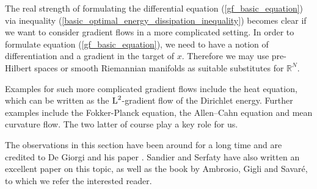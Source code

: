 The real strength of formulating the differential equation 
(\ref{gf_basic_equation}) via inequality 
(\ref{basic_optimal_energy_dissipation_inequality}) becomes clear if we want to 
consider gradient flows in a more complicated setting. In order to formulate 
equation (\ref{gf_basic_equation}), we need to have a notion of differentiation 
and a gradient in the target of $ x $. Therefore we may use pre-Hilbert spaces 
or smooth Riemannian manifolds as suitable substitutes for $ \mathbb{ R }^{ N 
} $. 

Examples for such more complicated gradient flows include the heat equation, 
which can be written as the $ \operatorname{L}^{ 2 } $-gradient flow of the Dirichlet 
energy. 
Further examples include  
the Fokker-Planck equation, the Allen--Cahn equation and mean curvature flow. 
The two latter of course play a key role for us.
\begin{comment}
A first example for a generalization is therefore the heat equation $ \partial_{ t } u - \Delta u = 0 $ for some open and bounded set $ \Omega $. As our space, we shall take $ \mathrm{ H }_{ 0 }^{ 1 } ( \Omega ) $ equipped with the inner product
\begin{equation*}
	\inner*{ u }{ v }
	\coloneqq
	\int
		\inner*{ u }{ v }
	\dd{ x }.
\end{equation*}
Our energy is given by the Dirichlet functional
\begin{equation*}
	\energy ( u ) \coloneqq
	\frac{ 1 }{ 2 }
	\int
		\abs{ \nabla u }^{ 2 }
	\dd{ x }
\end{equation*}
Then we can compute that at least on $ \mathrm{ H }_{ 0 }^{ 1 } \cap \mathrm{ H }^{ 2 } ( \Omega ) $, the Fréchet derivative of $ \energy $ is given by $ \diff ( E ) ( u ) [ v ] = - \int \Delta u v \dd{ x } $.
\end{comment}

The observations in this section have been around for a long time and are 
credited 
to De Giorgi and his paper 
\cite{de_giorgi_new_problems_on_minimizing_movements}. Sandier and Serfaty have 
also written an excellent paper 
\cite{sandler_serfaty_gamme_convergence_of_gf_with_applications_to_gl} on this 
topic, as well as the book 
\cite{ambrosio_gigli_savare_gradient_flows_in_metric_spaces_and_in_the_space_of_prob_measures}
by Ambrosio, Gigli and 
Savaré,
to which we refer the 
interested reader.